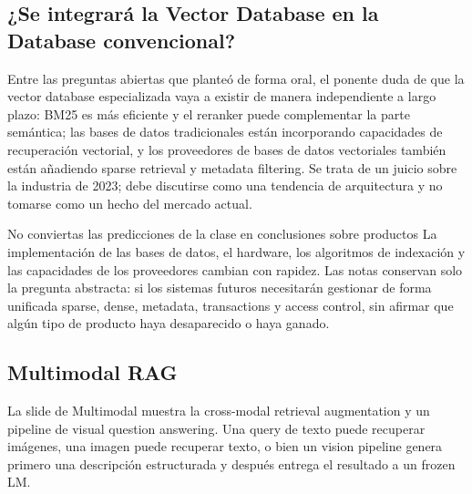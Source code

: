 
\subsection{¿Se integrará la Vector Database en la Database convencional?}

Entre las preguntas abiertas que planteó de forma oral, el ponente duda de que la vector database especializada vaya a existir de manera independiente a largo plazo: BM25 es más eficiente y el reranker puede complementar la parte semántica; las bases de datos tradicionales están incorporando capacidades de recuperación vectorial, y los proveedores de bases de datos vectoriales también están añadiendo sparse retrieval y metadata filtering. Se trata de un juicio sobre la industria de 2023; debe discutirse como una tendencia de arquitectura y no tomarse como un hecho del mercado actual.

\begin{warningbox}{No conviertas las predicciones de la clase en conclusiones sobre productos}
La implementación de las bases de datos, el hardware, los algoritmos de indexación y las capacidades de los proveedores cambian con rapidez. Las notas conservan solo la pregunta abstracta: si los sistemas futuros necesitarán gestionar de forma unificada sparse, dense, metadata, transactions y access control, sin afirmar que algún tipo de producto haya desaparecido o haya ganado.
\end{warningbox}

\subsection{Multimodal RAG}

La slide de Multimodal muestra la cross-modal retrieval augmentation y un pipeline de visual question answering. Una query de texto puede recuperar imágenes, una imagen puede recuperar texto, o bien un vision pipeline genera primero una descripción estructurada y después entrega el resultado a un frozen LM.


